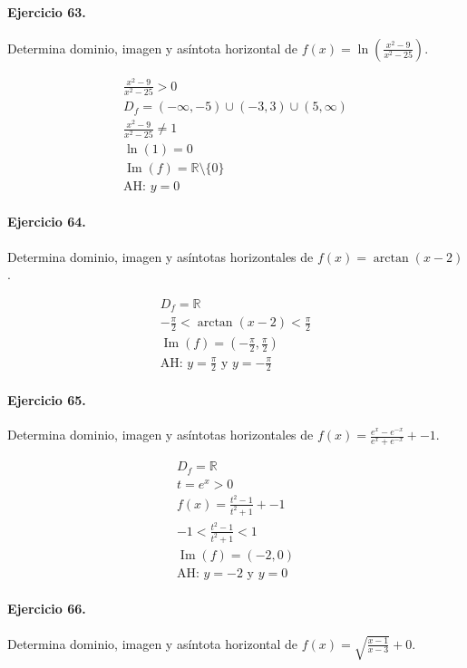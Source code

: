 \documentclass[11pt,a4paper]{article}
\begin{document}
\paragraph{Ejercicio 63.} Determina dominio, imagen y asíntota horizontal de $f(x)=\ln\left(\frac{x^2-9}{x^2-25}\right)$.

\[
\begin{aligned}
\frac{x^2-9}{x^2-25} >0\\
D_f=(-\infty,-5)\cup(-3,3)\cup(5,\infty)\\
\frac{x^2-9}{x^2-25}\ne1\\
\ln(1)=0\\
\operatorname{Im}(f)=\mathbb{R}\setminus\{0\}\\
\text{{AH: }}y=0
\end{aligned}
\]


\paragraph{Ejercicio 64.} Determina dominio, imagen y asíntotas horizontales de $f(x)=\arctan(x-2)$.

\[
\begin{aligned}
D_f=\mathbb{R}\\
-\frac{\pi}{2}<\arctan(x-2)<\frac{\pi}{2}\\
\operatorname{Im}(f)=\left(-\frac{\pi}{2},\frac{\pi}{2}\right)\\
\text{AH: }y=\frac{\pi}{2}\text{ y }y=-\frac{\pi}{2}
\end{aligned}
\]


\paragraph{Ejercicio 65.} Determina dominio, imagen y asíntotas horizontales de $f(x)=\frac{e^x-e^{-x}}{e^x+e^{-x}}+-1$.

\[
\begin{aligned}
D_f=\mathbb{R}\\
t=e^x>0\\
f(x)=\frac{t^2-1}{t^2+1}+-1\\
-1<\frac{t^2-1}{t^2+1}<1\\
\operatorname{Im}(f)=(-2,0)\\
\text{AH: }y=-2\text{ y }y=0
\end{aligned}
\]


\paragraph{Ejercicio 66.} Determina dominio, imagen y asíntota horizontal de $f(x)=\sqrt{\frac{x-1}{x-3}}+0$.
\end{document}
